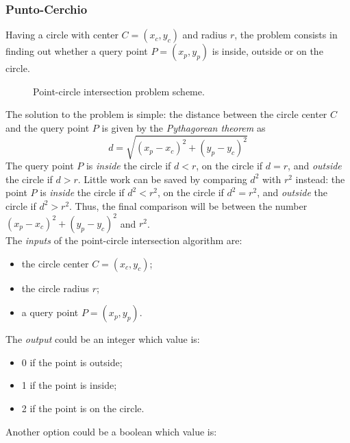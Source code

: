 \subsubsection{Punto-Cerchio}
Having a circle with center $C = (x_c, y_c)$ and radius $r$, the problem consists in finding out whether a query point $P = (x_p, y_p)$ is inside, outside or on the circle.
%
\begin{figure}
	\centering
	\caption{Point-circle intersection problem scheme.}
\end{figure}
%
The solution to the problem is simple: the distance between the circle center $C$ and the query point $P$ is given by the \textit{Pythagorean theorem} as
\begin{equation}
	d=\sqrt{(x_p-x_c)^2 + (y_p-y_c)^2}
\end{equation}
The query point $P$ is \textit{inside} the circle if $d<r$, on the circle if $d = r$, and \textit{outside} the circle if $d > r$. Little work can be saved by comparing $d^2$ with $r^2$ instead: the point $P$ is \textit{inside} the circle if $d^2<r^2$, on the circle if $d^2 = r^2$, and \textit{outside} the circle if $d^2 > r^2$. Thus, the final comparison will be between the number $(x_p-x_c)^2 + (y_p-y_c)^2$ and $r^2$.\\
The \textit{inputs} of the point-circle intersection algorithm are:
\begin{itemize}
	\item the circle center $C = (x_c, y_c)$;
	\item the circle radius $r$;
	\item a query point $P=(x_p, y_p)$.
\end{itemize}
The \textit{output} could be an integer which value is:
\begin{itemize}
	\item 0 if the point is outside;
	\item 1 if the point is inside;
	\item 2 if the point is on the circle.
\end{itemize}
Another option could be a boolean which value is:
